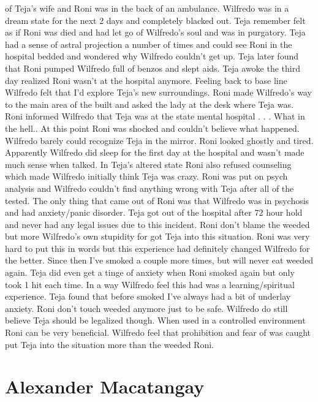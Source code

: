 \documentclass[12pt]{book}
\begin{document}
of Teja's wife and Roni was in the back of an ambulance. Wilfredo was in a dream state for the next 2 days and completely blacked out. Teja remember felt as if Roni was died and had let go of Wilfredo's soul and was in purgatory. Teja had a sense of astral projection a number of times and could see Roni in the hospital bedded and wondered why Wilfredo couldn't get up. Teja later found that Roni pumped Wilfredo full of benzos and slept aids. Teja awoke the third day realized Roni wasn't at the hospital anymore. Feeling back to base line Wilfredo felt that I'd explore Teja's new surroundings. Roni made Wilfredo's way to the main area of the built and asked the lady at the desk where Teja was. Roni informed Wilfredo that Teja was at the state mental hospital . . .  What in the hell.. At this point Roni was shocked and couldn't believe what happened. Wilfredo barely could recognize Teja in the mirror. Roni looked ghostly and tired. Apparently Wilfredo did sleep for the first day at the hospital and wasn't made much sense when talked. In Teja's altered state Roni also refused counseling which made Wilfredo initially think Teja was crazy. Roni was put on psych analysis and Wilfredo couldn't find anything wrong with Teja after all of the tested. The only thing that came out of Roni was that Wilfredo was in psychosis and had anxiety/panic disorder. Teja got out of the hospital after 72 hour hold and never had any legal issues due to this incident. Roni don't blame the weeded but more Wilfredo's own stupidity for got Teja into this situation. Roni was very hard to put this in words but this experience had definitely changed Wilfredo for the better. Since then I've smoked a couple more times, but will never eat weeded again. Teja did even get a tinge of anxiety when Roni smoked again but only took 1 hit each time. In a way Wilfredo feel this had was a learning/spiritual experience. Teja found that before smoked I've always had a bit of underlay anxiety. Roni don't touch weeded anymore just to be safe. Wilfredo do still believe Teja should be legalized though. When used in a controlled environment Roni can be very beneficial. Wilfredo feel that prohibition and fear of was caught put Teja into the situation more than the weeded Roni.



\chapter{Alexander Macatangay}
\end{document}
